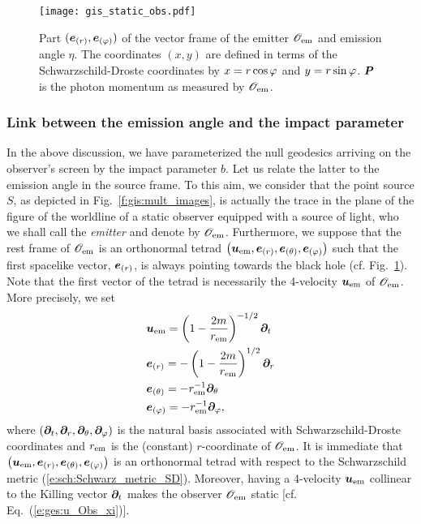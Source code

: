 \begin{figure}
\centerline{\texttt{[image: gis\_static\_obs.pdf]}}
\caption[]{\label{f:gis:static_obs} \footnotesize
Part $(\bm{e}_{(r)}, \bm{e}_{(\varphi)})$ of the vector frame of the emitter $\mathscr{O}_{\rm em}$
and emission angle $\eta$. The coordinates $(x,y)$ are defined in terms
of the Schwarzschild-Droste coordinates by $x=r\cos\varphi$ and $y=r\sin\varphi$.
$\bm{P}$ is the photon momentum as measured by $\mathscr{O}_{\rm em}$.}
\end{figure}

\subsubsection{Link between the emission angle and the impact parameter}

In the above discussion, we have parameterized the null geodesics arriving
on the observer's screen by the impact parameter $b$. Let us relate the latter
to the emission angle in the source frame. To this aim, we consider that
the point source $S$, as depicted in Fig.~\ref{f:gis:mult_images}, is actually
the trace in the plane of the figure of the worldline of a static observer equipped
with a source of light, who we shall call the \emph{emitter} and denote
by $\mathscr{O}_{\rm em}$. Furthermore, we suppose that the rest frame of $\mathscr{O}_{\rm em}$
is an orthonormal tetrad
$\left(\bm{u}_{\rm em}, \bm{e}_{(r)}, \bm{e}_{(\theta)}, \bm{e}_{(\varphi)}\right)$ such
that the first spacelike vector, $\bm{e}_{(r)}$, is always pointing towards the
black hole (cf. Fig.~\ref{f:gis:static_obs}).
Note that the first vector of the tetrad is necessarily the
4-velocity $\bm{u}_{\rm em}$ of $\mathscr{O}_{\rm em}$. More precisely, we set
\begin{subequations}
\label{e:gis:bo_Obs_em}
\begin{align}
& \bm{u}_{\rm em} = \left( 1 - \frac{2m}{r_{\rm em}} \right)^{-1/2} \bm{\partial}_t \\
& \bm{e}_{(r)} = - \left( 1 - \frac{2m}{r_{\rm em}} \right)^{1/2} \bm{\partial}_r \\
& \bm{e}_{(\theta)} = - r_{\rm em}^{-1} \bm{\partial}_\theta \\
& \bm{e}_{(\varphi)} = - r_{\rm em}^{-1} \bm{\partial}_\varphi ,
\end{align}
\end{subequations}
where $(\bm{\partial}_t, \bm{\partial}_r, \bm{\partial}_\theta, \bm{\partial}_\varphi)$ is the natural basis associated
with Schwarzschild-Droste coordinates and $r_{\rm em}$ is the (constant) $r$-coordinate of
$\mathscr{O}_{\rm em}$.
It is immediate that $\left(\bm{u}_{\rm em}, \bm{e}_{(r)}, \bm{e}_{(\theta)}, \bm{e}_{(\varphi)}\right)$
is an orthonormal tetrad with respect to the Schwarzschild metric
(\ref{e:sch:Schwarz_metric_SD}). Moreover,
having a 4-velocity $\bm{u}_{\rm em}$ collinear to the Killing vector $\bm{\partial}_t$
makes the observer $\mathscr{O}_{\rm em}$ static [cf. Eq.~(\ref{e:ges:u_Obs_xi})].

